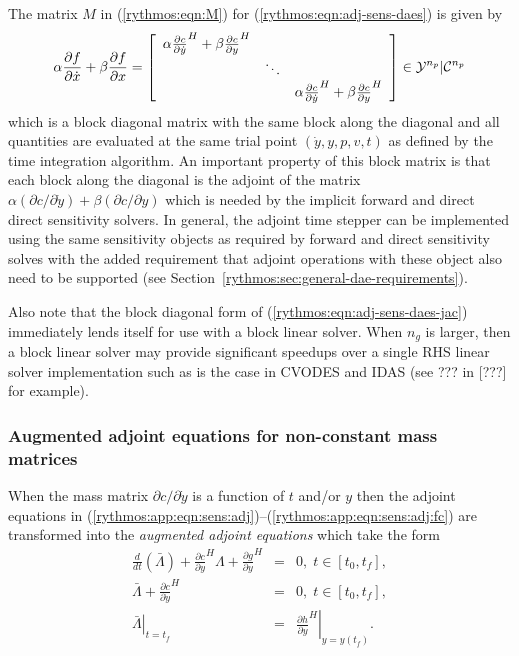 \documentclass[pdf,ps2pdf,11pt]{SANDreport}
\begin{document}
The matrix $M$ in (\ref{rythmos:eqn:M}) for
(\ref{rythmos:eqn:adj-sens-daes}) is given by
%
\begin{equation}
\alpha \frac{\partial f}{\partial \dot{x}} + \beta \frac{\partial f}{\partial x}
= 
{\bmat{ccc}
\alpha \frac{\partial c}{\partial \dot{y}}^H + \beta \frac{\partial c}{\partial y}^H \\
& \ddots \\
& & \alpha \frac{\partial c}{\partial \dot{y}}^H + \beta \frac{\partial c}{\partial y}^H
\emat}
\in \mathcal{Y}^{n_p}|\mathcal{C}^{n_p}
\label{rythmos:eqn:adj-sens-daes-jac}
\end{equation}
%
which is a block diagonal matrix with the same block along the diagonal and
all quantities are evaluated at the same trial point $(\dot{y},y,p,v,t)$ as
defined by the time integration algorithm.  An important property of this
block matrix is that each block along the diagonal is the adjoint of the
matrix ${}\alpha (\partial c / {}\partial {}\dot{y}) + {}\beta (\partial c /
{}\partial y)$ which is needed by the implicit forward and direct direct
sensitivity solvers.  In general, the adjoint time stepper can be implemented
using the same sensitivity objects as required by forward and direct
sensitivity solves with the added requirement that adjoint operations with
these object also need to be supported (see
Section~\ref{rythmos:sec:general-dae-requirements}).

Also note that the block diagonal form of
(\ref{rythmos:eqn:adj-sens-daes-jac}) immediately lends itself for use with a
block linear solver.  When $n_g$ is larger, then a block linear solver may
provide significant speedups over a single RHS linear solver implementation
such as is the case in CVODES and IDAS (see ??? in [???] for example).

\subsubsection{Augmented adjoint equations for non-constant mass matrices}

When the mass matrix $\partial c / {}\partial {}\dot{y}$ is a function of $t$
and/or $y$ then the adjoint equations in
(\ref{rythmos:app:eqn:sens:adj})--(\ref{rythmos:app:eqn:sens:adj:fc}) are
transformed into the {}\textit{augmented adjoint equations} which take the
form
%
\begin{eqnarray}
\frac{d}{dt}\left( \bar{\Lambda} \right)
+  \frac{\partial c}{\partial y}^H \Lambda + \frac{\partial g}{\partial y}^H
& = & 0, \; t \in \left[ t_0, t_f \right],
\label{rythmos:app:eqn:sens:aug-adj-de} \\
\bar{\Lambda} + \frac{\partial c}{\partial \dot{y}}^H
& = & 0, \; t \in \left[ t_0, t_f \right],
\label{rythmos:app:eqn:sens:aug-adj-ae} \\
\left. \bar{\Lambda} \right|_{t=t_f}
& = & \left. \frac{\partial h}{\partial y}^H \right|_{y=y(t_f)}.
\label{rythmos:eqn:sens:aug-adj:fc}
\end{eqnarray}
\end{document}
